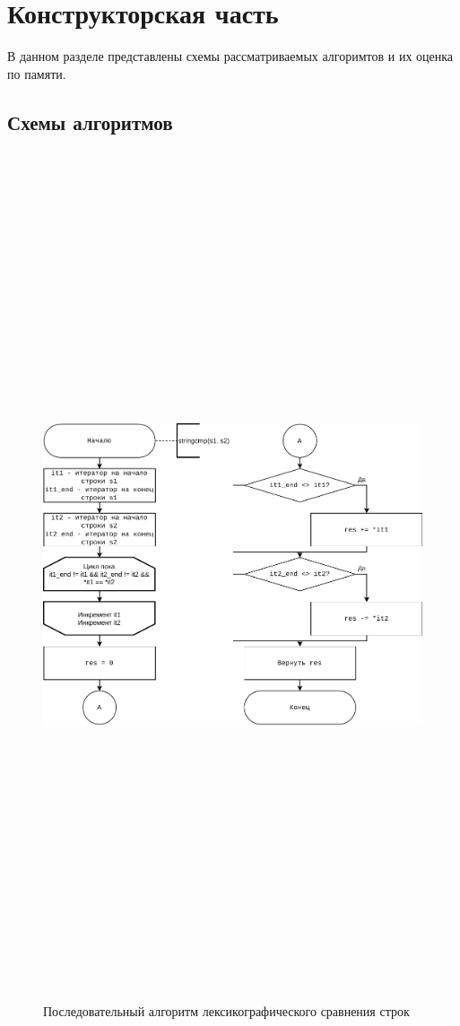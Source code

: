 \chapter{Конструкторская часть}

    В данном разделе представлены схемы рассматриваемых алгоримтов и их оценка по памяти.
    
    \section{Схемы алгоритмов}
    
        \begin{figure}
            \centering
            \includegraphics[width=15cm,height=25cm,keepaspectratio]{images/nonparallel.pdf}
            \caption{Последовательный алгоритм лексикографического сравнения строк}
            \label{fig:nonparallel}
        \end{figure}
        
